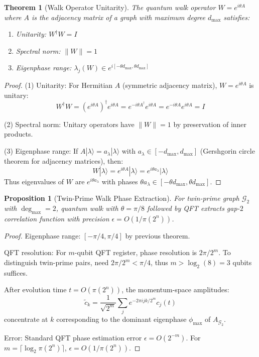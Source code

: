 \documentclass[11pt,letterpaper]{article}
\newtheorem{theorem}{Theorem}
\newtheorem{proposition}{Proposition}
\begin{document}
\begin{theorem}[Walk Operator Unitarity]
The quantum walk operator $W = e^{i\theta A}$ where $A$ is the adjacency matrix of a graph with maximum degree $d_{\max}$ satisfies:
\begin{enumerate}
\item Unitarity: $W^\dagger W = I$
\item Spectral norm: $\|W\| = 1$
\item Eigenphase range: $\lambda_j(W) \in e^{i[-\theta d_{\max}, \theta d_{\max}]}$
\end{enumerate}
\end{theorem}

\begin{proof}
(1) Unitarity: For Hermitian $A$ (symmetric adjacency matrix), $W = e^{i\theta A}$ is unitary:
\[
W^\dagger W = (e^{i\theta A})^\dagger e^{i\theta A} = e^{-i\theta A^\dagger} e^{i\theta A} = e^{-i\theta A} e^{i\theta A} = I
\]

(2) Spectral norm: Unitary operators have $\|W\| = 1$ by preservation of inner products.

(3) Eigenphase range: If $A|\lambda\rangle = a_\lambda|\lambda\rangle$ with $a_\lambda \in [-d_{\max}, d_{\max}]$ (Gershgorin circle theorem for adjacency matrices), then:
\[
W|\lambda\rangle = e^{i\theta A}|\lambda\rangle = e^{i\theta a_\lambda}|\lambda\rangle
\]
Thus eigenvalues of $W$ are $e^{i\theta a_\lambda}$ with phases $\theta a_\lambda \in [-\theta d_{\max}, \theta d_{\max}]$.
\end{proof}

\begin{proposition}[Twin-Prime Walk Phase Extraction]
For twin-prime graph $\mathcal{G}_2$ with $\deg_{\max} = 2$, quantum walk with $\theta = \pi/8$ followed by QFT extracts gap-$2$ correlation function with precision $\epsilon = O(1/\pi(2^n))$.
\end{proposition}

\begin{proof}
Eigenphase range: $[-\pi/4, \pi/4]$ by previous theorem.

QFT resolution: For $m$-qubit QFT register, phase resolution is $2\pi/2^m$. To distinguish twin-prime pairs, need $2\pi/2^m < \pi/4$, thus $m > \log_2(8) = 3$ qubits suffices.

After evolution time $t = O(\pi(2^n))$, the momentum-space amplitudes:
\[
\tilde{c}_k = \frac{1}{\sqrt{2^m}}\sum_j e^{-2\pi i jk/2^m} c_j(t)
\]
concentrate at $k$ corresponding to the dominant eigenphase $\phi_{\max}$ of $A_{\mathcal{G}_2}$.

Error: Standard QFT phase estimation error $\epsilon = O(2^{-m})$. For $m = \lceil \log_2 \pi(2^n) \rceil$, $\epsilon = O(1/\pi(2^n))$.
\end{proof}
\end{document}
